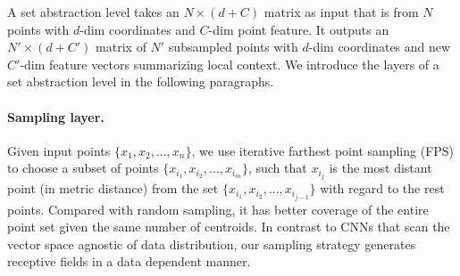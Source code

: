 
A set abstraction level takes an $N \times (d+C)$ matrix as input that is from $N$ points with $d$-dim coordinates and $C$-dim point feature. It outputs an $N' \times (d+C')$ matrix of $N'$ subsampled points with $d$-dim coordinates and new $C'$-dim feature vectors summarizing local context. We introduce the layers of a set abstraction level in the following paragraphs.




\vspace{-0.3cm}
\paragraph{Sampling layer.}
Given input points $\{x_1, x_2, ..., x_n\}$, we use iterative farthest point sampling (FPS) to choose a subset of points $\{x_{i_1}, x_{i_2}, ..., x_{i_m}\}$, such that $x_{i_j}$ is the most distant point (in metric distance) from the set $\{x_{i_1}, x_{i_2},...,x_{i_{j-1}}\}$ with regard to the rest points. %
Compared with random sampling, it has better coverage of the entire point set given the same number of centroids. In contrast to CNNs that scan the vector space agnostic of data distribution, our sampling strategy generates receptive fields in a data dependent manner. %

